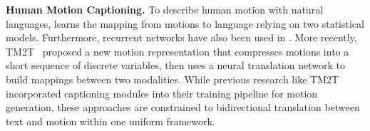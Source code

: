 \vspace{20pt}
\begin{table}[t]
\label{tab:checkmark}
\vspace{5pt}
\caption{Comparison of recent state-of-the-art methods on diverse motion-relevant tasks. \textit{Random Motion} and \textit{Random Caption} represent unconstrained generation of motions and motion descriptions.}
\vspace{-10pt}
\end{table}

\textbf{Human Motion Captioning.} To describe human motion with natural languages, \cite{takano2015statistical} learns the mapping from motions to language relying on two statistical models.
%
Furthermore, recurrent networks have also been used in \cite{yamada2018rae,plappert2018learning}. 
More recently, TM2T~\cite{chuan2022tm2t} proposed a new motion representation that compresses motions into a short sequence of discrete variables, then uses a neural translation network to build mappings between two modalities. While previous research like TM2T~\cite{chuan2022tm2t} incorporated captioning modules into their training pipeline for motion generation, these approaches are constrained to bidirectional translation between text and motion within one uniform framework.

